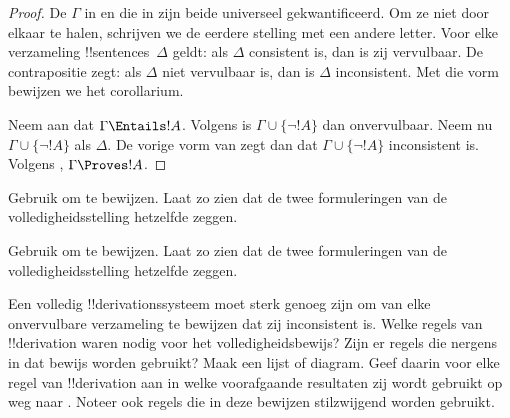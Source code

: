 \documentclass[openany]{memoir}
\begin{document}
\begin{proof}
De $\Gamma$ in  en die in
 zijn beide universeel gekwantificeerd. Om ze
niet door elkaar te halen, schrijven we de eerdere stelling met een
andere letter. Voor elke verzameling !!{sentence}s~$\Delta$ geldt: als
$\Delta$ consistent is, dan is zij vervulbaar. De contrapositie zegt:
als $\Delta$ niet vervulbaar is, dan is $\Delta$ inconsistent. Met die vorm
bewijzen we het corollarium.

Neem aan dat $\Gamma \Entails !A$. Volgens
 is $\Gamma \cup \{\lnot !A\}$ dan
onvervulbaar. Neem nu $\Gamma \cup \{\lnot !A\}$ als $\Delta$. De vorige
vorm van  zegt dan dat
$\Gamma \cup \{\lnot !A\}$ inconsistent is. Volgens
,
$\Gamma \Proves !A$.
\end{proof}

\begin{prob}
Gebruik  om
 te bewijzen. Laat zo zien dat de
twee formuleringen van de volledigheidsstelling hetzelfde zeggen.
\end{prob}
\tagendprob

\begin{prob}
Gebruik  om
 te bewijzen. Laat zo zien dat de
twee formuleringen van de volledigheidsstelling hetzelfde zeggen.
\end{prob}
\tagendprob

\begin{prob}
Een volledig !!{derivation}ssysteem moet sterk genoeg zijn om van elke
onvervulbare verzameling te bewijzen dat zij inconsistent is. Welke
regels van !!{derivation} waren nodig voor het volledigheidsbewijs? Zijn
er regels die nergens in dat bewijs worden gebruikt? Maak een lijst of
diagram. Geef daarin voor elke regel van !!{derivation} aan in welke
voorafgaande resultaten zij wordt gebruikt op weg naar
. Noteer ook regels die in deze
bewijzen stilzwijgend worden gebruikt.
\end{prob}
\tagendprob
\end{document}
